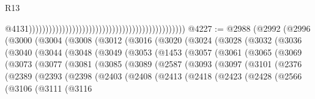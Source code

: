 \begin{lexlean}{R13}
\begin{coremodule}
                                                                                                  @4131)))))))))))))))))))))))))))))))))))))))))))))))
@4227 := @2988
    (@2992
      (@2996
        (@3000
          (@3004
            (@3008
              (@3012
                (@3016
                  (@3020
                    (@3024
                      (@3028
                        (@3032
                          (@3036
                            (@3040
                              (@3044
                                (@3048
                                  (@3049
                                    (@3053
                                      (@1453
                                        (@3057
                                          (@3061
                                            (@3065
                                              (@3069
                                                (@3073
                                                  (@3077
                                                    (@3081
                                                      (@3085
                                                        (@3089
                                                          (@2587
                                                            (@3093
                                                              (@3097
                                                                (@3101
                                                                  (@2376
                                                                    (@2389
                                                                      (@2393
                                                                        (@2398
                                                                          (@2403
                                                                            (@2408
                                                                              (@2413
                                                                                (@2418
                                                                                  (@2423
                                                                                    (@2428
                                                                                      (@2566
                                                                                        (@3106
                                                                                          (@3111
                                                                                            (@3116

\end{coremodule}
\end{lexlean}
